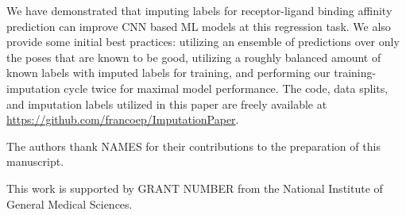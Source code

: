 \documentclass[journal=jmcmar,manuscript=article]{achemso}
\begin{document}
We have demonstrated that imputing labels for receptor-ligand binding affinity prediction can improve CNN based ML models at this regression task.
We also provide some initial best practices: utilizing an ensemble of predictions over only the poses that are known to be good, utilizing a roughly balanced amount of known labels with imputed labels for training, and performing our training-imputation cycle twice for maximal model performance.
The code, data splits, and imputation labels utilized in this paper are freely available at \url{https://github.com/francoep/ImputationPaper}.


\begin{acknowledgement}

The authors thank NAMES for their contributions to the preparation of this manuscript.

This work is supported by GRANT NUMBER from the National Institute of General Medical Sciences.

\end{acknowledgement}




\end{document}
